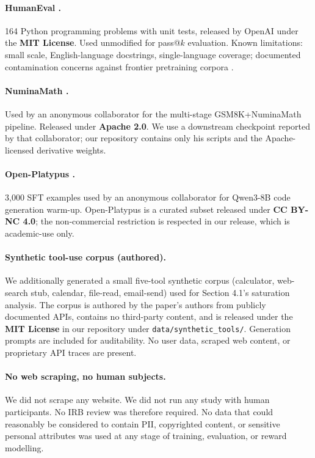 \paragraph{HumanEval \cite{chen2021codex}.}
164 Python programming problems with unit tests, released by OpenAI under
the \textbf{MIT License}. Used unmodified for pass@$k$ evaluation. Known
limitations: small scale, English-language docstrings, single-language
coverage; documented contamination concerns against frontier pretraining
corpora \cite{riddell2024contamination}.

\paragraph{NuminaMath \cite{li2024numinamath}.}
Used by an anonymous collaborator for the multi-stage
GSM8K+NuminaMath pipeline. Released under \textbf{Apache 2.0}. We use a
downstream checkpoint reported by that collaborator; our repository contains only his
scripts and the Apache-licensed derivative weights.

\paragraph{Open-Platypus \cite{lee2023platypus}.}
3{,}000 SFT examples used by an anonymous collaborator for Qwen3-8B code
generation warm-up. Open-Platypus is a curated subset released under
\textbf{CC BY-NC 4.0}; the non-commercial restriction is respected in our
release, which is academic-use only.

\paragraph{Synthetic tool-use corpus (authored).}
We additionally generated a small five-tool synthetic corpus (calculator,
web-search stub, calendar, file-read, email-send) used for Section 4.1's
saturation analysis. The corpus is authored by the paper's authors from
publicly documented APIs, contains no third-party content, and is
released under the \textbf{MIT License} in our repository under
\texttt{data/synthetic\_tools/}. Generation prompts are included for
auditability. No user data, scraped web content, or proprietary API
traces are present.

\paragraph{No web scraping, no human subjects.}
We did not scrape any website. We did not run any study with human
participants. No IRB review was therefore required. No data that could
reasonably be considered to contain PII, copyrighted content, or sensitive
personal attributes was used at any stage of training, evaluation, or
reward modelling.


